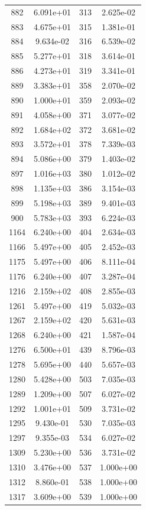 \documentclass[12pt]{article}
\begin{document}
\begin{longtable}{@{}cccc@{}}
882 & 6.091e+01 & 313 & 2.625e-02 \\
883 & 4.675e+01 & 315 & 1.381e-01 \\
884 & 9.634e-02 & 316 & 6.539e-02 \\
885 & 5.277e+01 & 318 & 3.614e-01 \\
886 & 4.273e+01 & 319 & 3.341e-01 \\
889 & 3.383e+01 & 358 & 2.070e-02 \\
890 & 1.000e+01 & 359 & 2.093e-02 \\
891 & 4.058e+00 & 371 & 3.077e-02 \\
892 & 1.684e+02 & 372 & 3.681e-02 \\
893 & 3.572e+01 & 378 & 7.339e-03 \\
894 & 5.086e+00 & 379 & 1.403e-02 \\
897 & 1.016e+03 & 380 & 1.012e-02 \\
898 & 1.135e+03 & 386 & 3.154e-03 \\
899 & 5.198e+03 & 389 & 9.401e-03 \\
900 & 5.783e+03 & 393 & 6.224e-03 \\
1164 & 6.240e+00 & 404 & 2.634e-03 \\
1166 & 5.497e+00 & 405 & 2.452e-03 \\
1175 & 5.497e+00 & 406 & 8.111e-04 \\
1176 & 6.240e+00 & 407 & 3.287e-04 \\
1216 & 2.159e+02 & 408 & 2.855e-03 \\
1261 & 5.497e+00 & 419 & 5.032e-03 \\
1267 & 2.159e+02 & 420 & 5.631e-03 \\
1268 & 6.240e+00 & 421 & 1.587e-04 \\
1276 & 6.500e+01 & 439 & 8.796e-03 \\
1278 & 5.695e+00 & 440 & 5.657e-03 \\
1280 & 5.428e+00 & 503 & 7.035e-03 \\
1289 & 1.209e+00 & 507 & 6.027e-02 \\
1292 & 1.001e+01 & 509 & 3.731e-02 \\
1295 & 9.430e-01 & 530 & 7.035e-03 \\
1297 & 9.355e-03 & 534 & 6.027e-02 \\
1309 & 5.230e+00 & 536 & 3.731e-02 \\
1310 & 3.476e+00 & 537 & 1.000e+00 \\
1312 & 8.860e-01 & 538 & 1.000e+00 \\
1317 & 3.609e+00 & 539 & 1.000e+00 \\

\end{longtable}
\end{document}
